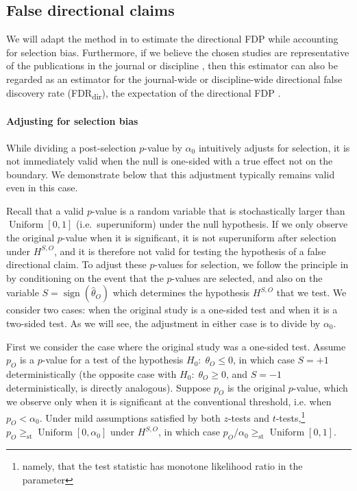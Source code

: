 \documentclass[aoas, preprint]{imsart}
\theoremstyle{definition}
\theoremstyle{custom}
\DeclareMathOperator{\sgn}{sign}
\DeclareMathOperator{\Uniform}{Uniform}
\newcommand{\htheta}{\hat{\theta}}
\newcommand{\ao}{\alpha_0}
\newcommand{\gest}{\ge_\text{st}}
\begin{document}
\subsection{False directional claims}

  We will adapt the method in \citet{Storey:2002vj} to estimate the directional FDP while accounting for selection bias. Furthermore, if we believe the chosen studies are representative of the publications in the journal or discipline \citep[e.g.][]{Stroebe:2016dj}, then this estimator can also be regarded as an estimator for the journal-wide or discipline-wide directional false discovery rate (FDR\textsubscript{dir}), the expectation of the directional FDP \citep{Benjamini:2005bv}.

  \paragraph{Adjusting for selection bias} While dividing a post-selection $p$-value by $\ao$ intuitively adjusts for selection, it is not immediately valid when the null is one-sided with a true effect not on the boundary. We demonstrate below that this adjustment typically remains valid even in this case.

  Recall that a valid $p$-value is a random variable that is stochastically larger than $\Uniform[0, 1]$ (i.e.\ superuniform) under the null hypothesis. If we only observe the original $p$-value when it is significant, it is not superuniform after selection under $H^{S,O}$, and it is therefore not valid for testing the hypothesis of a false directional claim. To adjust these $p$-values for selection, we follow the principle in \citet{Fithian:2014ws} by conditioning on the event that the $p$-values are selected, and also on the variable $S = \sgn(\htheta_O)$ which determines the hypothesis $H^{S,O}$ that we test. We consider two cases: when the original study is a one-sided test and when it is a two-sided test. As we will see, the adjustment in either case is to divide by $\ao$.

  First we consider the case where the original study was a one-sided test. Assume $p_O$ is a $p$-value for a test of the hypothesis $H_0:\; \theta_O \le 0$, in which case $S = +1$ deterministically (the opposite case with $H_0:\; \theta_O \ge 0$, and $S = -1$ deterministically, is directly analogous). Suppose $p_O$ is the original $p$-value, which we observe only when it is significant at the conventional threshold, i.e. when $p_O < \ao$. Under mild assumptions satisfied by both $z$-tests and $t$-tests,\footnote{namely, that the test statistic has monotone likelihood ratio in the parameter} $p_O \gest \Uniform[0, \ao]$ under $H^{S,O}$, in which case $p_O/\ao \gest \Uniform[0,1]$.
\end{document}
